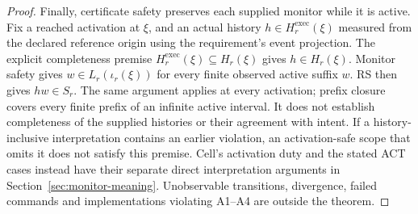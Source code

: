 \begin{proof}
Finally, certificate safety preserves each supplied monitor while it is active. Fix a reached activation at $\xi$, and an actual history $h\in H_r^{\mathrm{exec}}(\xi)$ measured from the declared reference origin using the requirement's event projection. The explicit completeness premise $H_r^{\mathrm{exec}}(\xi)\subseteq H_r(\xi)$ gives $h\in H_r(\xi)$. Monitor safety gives $w\in L_r(\iota_r(\xi))$ for every finite observed active suffix $w$. RS then gives $hw\in S_r$. The same argument applies at every activation; prefix closure covers every finite prefix of an infinite active interval. It does not establish completeness of the supplied histories or their agreement with intent. If a history-inclusive interpretation contains an earlier violation, an activation-safe scope that omits it does not satisfy this premise. Cell's activation duty and the stated ACT cases instead have their separate direct interpretation arguments in Section~\ref{sec:monitor-meaning}. Unobservable transitions, divergence, failed commands and implementations violating A1--A4 are outside the theorem.
\end{proof}
